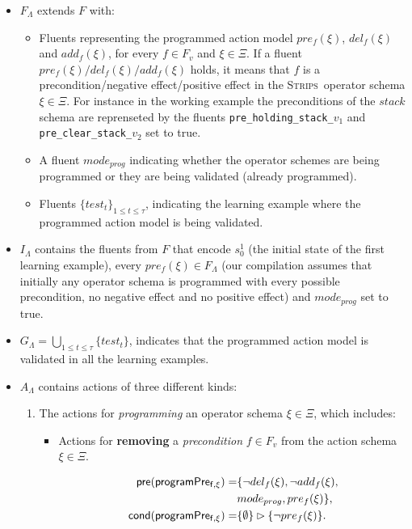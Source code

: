 \documentclass[letterpaper]{article} %
\newcommand{\pre}{\mathsf{pre}}     %
\newcommand{\cond}{\mathsf{cond}}   %
\newcommand{\strips}{\textsc{Strips}}     %
\begin{document}
\begin{itemize}
\item $F_{\Lambda}$ extends $F$ with:
\begin{itemize}
\item Fluents representing the programmed action model $pre_f(\xi)$, $del_f(\xi)$ and $add_f(\xi)$, for every $f\in F_v$ and $\xi \in \Xi$. If a fluent $pre_f(\xi)/del_f(\xi)/add_f(\xi)$ holds, it means that $f$ is a precondition/negative effect/positive effect in the \strips\ operator schema $\xi\in \Xi$. For instance in the working example the preconditions of the $stack$ schema are reprenseted by the fluents {\small\tt pre\_holding\_stack\_$v_1$} and {\small\tt pre\_clear\_stack\_$v_2$} set to true. 
\item A fluent $mode_{prog}$ indicating whether the operator schemes are being programmed or they are being validated (already programmed).
\item Fluents $\{test_t\}_{1\leq t\leq \tau}$, indicating the learning example where the programmed action model is being validated.
\end{itemize}
\item $I_{\Lambda}$ contains the fluents from $F$ that encode $s_0^1$ (the initial state of the first learning example), every $pre_f(\xi)\in F_{\Lambda}$ (our compilation assumes that initially any operator schema is programmed with every possible precondition, no negative effect and no positive effect) and $mode_{prog}$ set to true.
\item $G_{\Lambda}=\bigcup_{1\leq t\leq \tau}\{test_t\}$, indicates that the programmed action model is validated in all the learning examples.
\item $A_{\Lambda}$ contains actions of three different kinds:
\begin{enumerate}
\item The actions for {\em programming} an operator schema $\xi\in\Xi$, which includes:
\begin{itemize}
\item Actions for {\bf removing} a {\em precondition} $f\in F_v$ from the action schema $\xi\in\Xi$.

\begin{small}
\begin{align*}
\hspace*{7pt}\pre(\mathsf{programPre_{f,\xi}})=&\{\neg del_{f}(\xi),\neg add_{f}(\xi),\\
& mode_{prog}, pre_{f}(\xi)\},\\
\cond(\mathsf{programPre_{f,\xi}})=&\{\emptyset\}\rhd\{\neg pre_{f}(\xi)\}.
\end{align*}
\end{small}


\end{itemize}
\end{enumerate}
\end{itemize}
\end{document}

